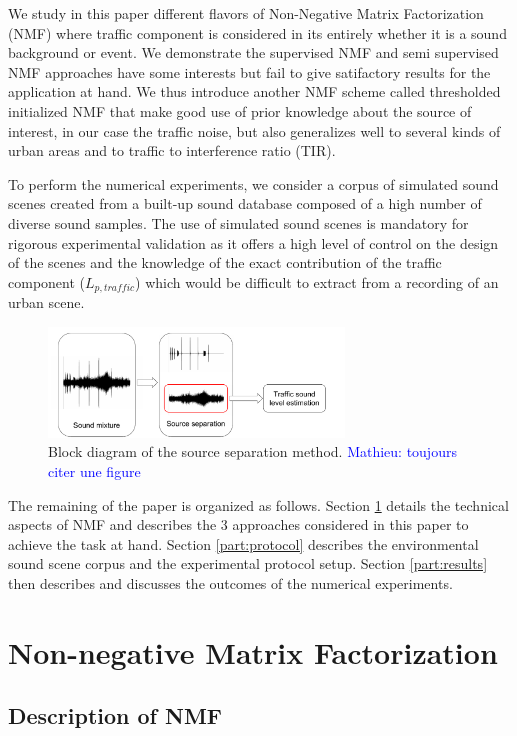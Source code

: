 \documentclass[twocolumn,a4paper,10pt]{article}
\newcommand{\ml}[1]{\textcolor{blue}{ Mathieu: #1}}
\begin{document}
We study in this paper different flavors of Non-Negative Matrix Factorization (NMF) where traffic component is considered in its entirely whether it is a sound background or event. We demonstrate the supervised NMF and semi supervised NMF approaches have some interests but fail to give satifactory results for the application at hand. We thus introduce another NMF scheme called thresholded initialized NMF that make good use of prior knowledge about the source of interest, in our case the traffic noise, but also generalizes well to several kinds of urban areas and to traffic to interference ratio (TIR).

To perform the numerical experiments, we consider a corpus of simulated sound scenes created from a built-up sound database composed of a high number of diverse sound samples. The use of simulated sound scenes is mandatory for rigorous experimental validation as it offers a high level of control on the design of the scenes and the knowledge of the exact contribution of the traffic component ($L_{p,traffic}$) which would be difficult to extract from a recording of an urban scene.

\begin{figure}[t]
\centering
\includegraphics[width=0.7\textwidth]{figures/bloc_diagram_source_separation.pdf}
\caption{Block diagram of the source separation method. \ml{toujours citer une figure}}
\label{fig:diagram}
\end{figure}

The remaining of the paper is organized as follows. Section \ref{part:nmf} details the technical aspects of NMF and describes the 3 approaches considered in this paper to achieve the task at hand. Section \ref{part:protocol} describes the environmental sound scene corpus and the experimental protocol setup. Section \ref{part:results} then describes and discusses the outcomes of the numerical experiments.

\section{Non-negative Matrix Factorization}\label{part:nmf}
\subsection{Description of NMF}
\end{document}
